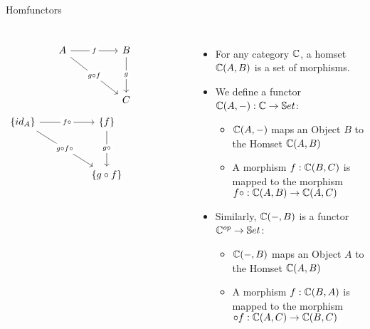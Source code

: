 \begin{frame}[fragile]{Homfunctors}
\begin{columns}
\[\begin{tikzcd}
	A && B \\
	\\
	&& C
	\arrow["f"{description}, from=1-1, to=1-3]
	\arrow["{g \circ f}"{description}, from=1-1, to=3-3]
	\arrow["g"{description}, from=1-3, to=3-3]
\end{tikzcd}\]
\[\begin{tikzcd}
	{\{id_A\}} && {\{f\}} && {} \\
	\\
	&& {\{g \circ f\}}
	\arrow["{f \circ}"{description}, from=1-1, to=1-3]
	\arrow["{g \circ f \circ}"{description}, from=1-1, to=3-3]
	\arrow["{g \circ}"{description}, from=1-3, to=3-3]
\end{tikzcd}\]
 \begin{itemize}
  \item For any category $\mathbb{C}$, a homset $\mathbb{C}(A,B)$ is a set of morphisms.
  \pause\item We define a functor $\mathbb{C}(A, -) : \mathbb{C} \to \mathbb{S}et$:
  \begin{itemize}
    \pause\item $\mathbb{C}(A, -)$ maps an Object $B$ to the Homset $\mathbb{C}(A,B)$
    \pause\item A morphism $f : \mathbb{C}(B,C)$ is mapped to the morphism $f \circ : \mathbb{C}(A,B) \to \mathbb{C}(A,C)$
  \end{itemize}
  \pause\item Similarly, $\mathbb{C}(-, B)$ is a functor $\mathbb{C}^{op} \to \mathbb{S}et$:
  \begin{itemize}
    \pause\item $\mathbb{C}(-, B)$ maps an Object $A$ to the Homset $\mathbb{C}(A,B)$
    \pause\item A morphism $f : \mathbb{C}(B,A)$ is mapped to the morphism $\circ f: \mathbb{C}(A,C) \to \mathbb{C}(B,C)$
  \end{itemize}
 \end{itemize}
 \end{columns}
\end{frame}
